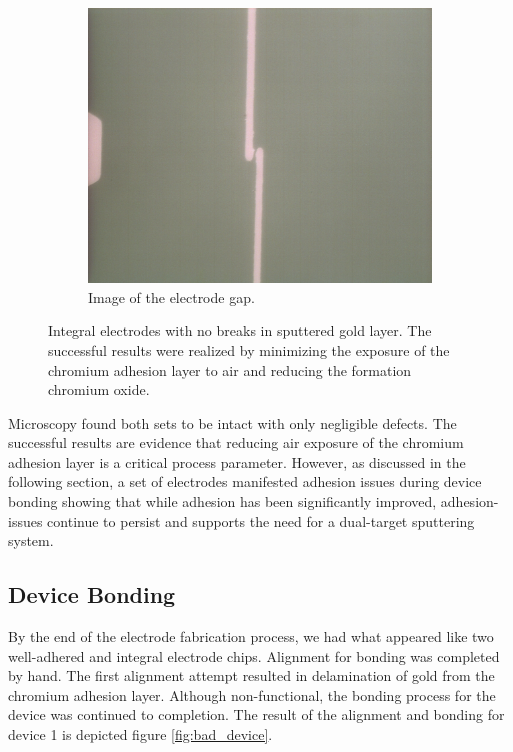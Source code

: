 \begin{figure}[h]
\begin{subfigure}[b]{0.45\textwidth}
        \includegraphics[width=\textwidth]{images/goodElectrodeCloseUp.png}
        \caption{Image of the electrode gap.}
    \end{subfigure}
    \caption[Integral electrodes.]{Integral electrodes with no breaks in sputtered gold layer. The successful results were realized by minimizing the exposure of the chromium adhesion layer to air and reducing the formation chromium oxide.}
    \label{fig:good_electrodes}
\end{figure}

\FloatBarrier

\par Microscopy found both sets to be intact with only negligible defects. The successful results are evidence that reducing air exposure of the chromium adhesion layer is a critical process parameter. However, as discussed in the following section, a set of electrodes manifested adhesion issues during device bonding showing that while adhesion has been significantly improved, adhesion-issues continue to persist and supports the need for a dual-target sputtering system.

\FloatBarrier

\subsection{Device Bonding}

\par By the end of the electrode fabrication process, we had what appeared like two well-adhered and integral electrode chips. Alignment for bonding was completed by hand. The first alignment attempt resulted in delamination of gold from the chromium adhesion layer. Although non-functional, the bonding process for the device was continued to completion. The result of the alignment and bonding for device 1 is depicted figure \ref{fig:bad_device}.

